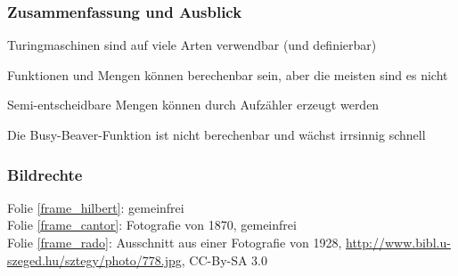 \documentclass[onlymath]{beamer}
\begin{document}
\begin{frame}\frametitle{Zusammenfassung und Ausblick}

Turingmaschinen sind auf viele Arten verwendbar (und definierbar)
\bigskip

Funktionen und Mengen können berechenbar sein, aber die meisten sind es nicht
\bigskip

Semi-entscheidbare Mengen können durch Aufzähler erzeugt werden
\bigskip

Die Busy-Beaver-Funktion ist nicht berechenbar und wächst irrsinnig schnell
\bigskip


\end{frame}

\begin{frame}[t]\frametitle{Bildrechte}

Folie \ref{frame_hilbert}: gemeinfrei\\
Folie \ref{frame_cantor}: Fotografie von 1870, gemeinfrei\\
Folie \ref{frame_rado}: Ausschnitt aus einer Fotografie von 1928, \url{http://www.bibl.u-szeged.hu/sztegy/photo/778.jpg}, CC-By-SA 3.0\\

\end{frame}
\end{document}
